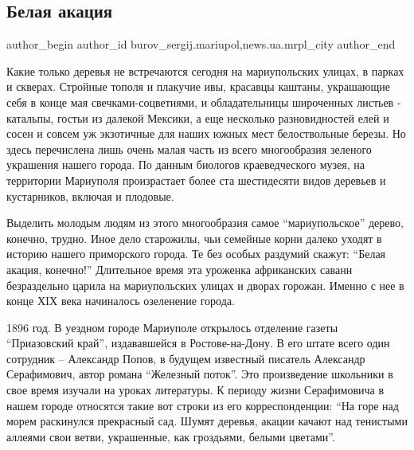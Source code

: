  
 
 
 
 
 
\subsection{Белая акация}
\label{sec:25_03_2018.stz.news.ua.mrpl_city.1.belaja_akacia}
 
\ifcmt
 author_begin
   author_id burov_sergij.mariupol,news.ua.mrpl_city
 author_end
\fi


Какие только деревья не встречаются сегодня на мариупольских улицах, в парках и
скверах. Стройные тополя и плакучие ивы, красавцы каштаны, украшающие себя в
конце мая свечками-соцветиями, и обладательницы широченных листьев -  катальпы,
гостьи из далекой Мексики, а еще несколько разновидностей елей и сосен и совсем
уж экзотичные для наших южных мест белоствольные березы. Но здесь перечислена
лишь очень малая часть из всего многообразия зеленого украшения нашего города.
По данным биологов краеведческого музея, на территории Мариуполя произрастает
более ста шестидесяти видов деревьев и кустарников, включая и плодовые.

Выделить молодым людям из этого многообразия самое \enquote{мариупольское} дерево,
конечно, трудно. Иное дело старожилы, чьи семейные корни далеко уходят в
историю нашего приморского города. Те без особых раздумий скажут: \enquote{Белая
акация, конечно!} Длительное время эта уроженка африканских саванн безраздельно
царила на мариупольских улицах и дворах горожан. Именно с нее в конце ХIХ века
начиналось озеленение города.

1896 год. В уездном городе Мариуполе открылось отделение газеты \enquote{Приазовский
край}, издававшейся в Ростове-на-Дону. В его штате всего один сотрудник –
Александр Попов, в будущем известный писатель Александр Серафимович, автор
романа \enquote{Железный поток}. Это произведение школьники в свое время изучали на
уроках литературы. К периоду жизни Серафимовича в нашем городе относятся такие
вот строки из его корреспонденции: \enquote{На горе над морем раскинулся прекрасный
сад. Шумят деревья, акации качают над тенистыми аллеями свои ветви, украшенные,
как гроздьями, белыми цветами}.

